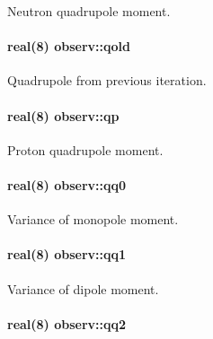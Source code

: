 Neutron quadrupole moment. 

\paragraph[{\texorpdfstring{qold}{qold}}]{\setlength{\rightskip}{0pt plus 5cm}real(8) observ\+::qold}\hypertarget{namespaceobserv_a8aaf442bc6b6a3d7ef38d939c0819e99}{}\label{namespaceobserv_a8aaf442bc6b6a3d7ef38d939c0819e99}


Quadrupole from previous iteration. 

\paragraph[{\texorpdfstring{qp}{qp}}]{\setlength{\rightskip}{0pt plus 5cm}real(8) observ\+::qp}\hypertarget{namespaceobserv_a234fb1ce0b2c529dac392fb68a962e8b}{}\label{namespaceobserv_a234fb1ce0b2c529dac392fb68a962e8b}


Proton quadrupole moment. 

\paragraph[{\texorpdfstring{qq0}{qq0}}]{\setlength{\rightskip}{0pt plus 5cm}real(8) observ\+::qq0}\hypertarget{namespaceobserv_afe768980804ddf6563d50cb7d003c1ab}{}\label{namespaceobserv_afe768980804ddf6563d50cb7d003c1ab}


Variance of monopole moment. 

\paragraph[{\texorpdfstring{qq1}{qq1}}]{\setlength{\rightskip}{0pt plus 5cm}real(8) observ\+::qq1}\hypertarget{namespaceobserv_ade8d12eb6ca05d5c2a9e15190a438bda}{}\label{namespaceobserv_ade8d12eb6ca05d5c2a9e15190a438bda}


Variance of dipole moment. 

\paragraph[{\texorpdfstring{qq2}{qq2}}]{\setlength{\rightskip}{0pt plus 5cm}real(8) observ\+::qq2}\hypertarget{namespaceobserv_aded073a456b95a001cacac23177dcf46}{}\label{namespaceobserv_aded073a456b95a001cacac23177dcf46}


